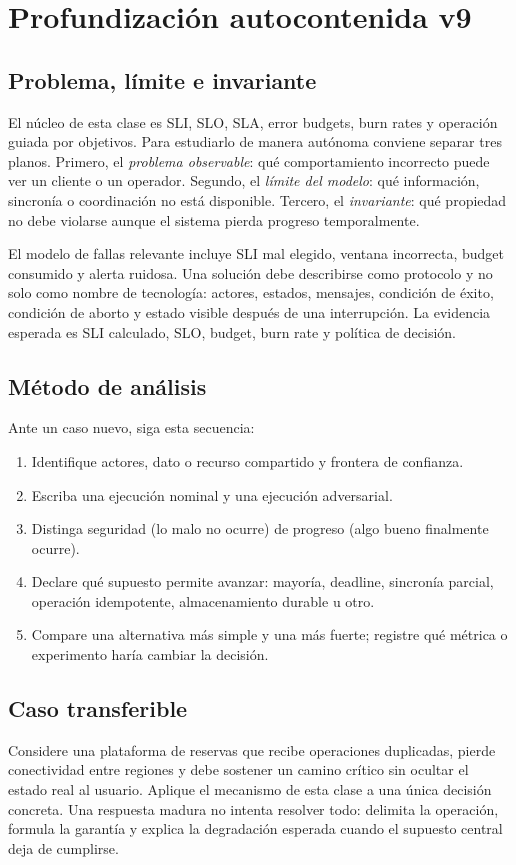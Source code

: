 \documentclass[variant=apuntes,cover=institutional,mode=screen]{ua-engineering-v6-article}
\begin{document}
\section{Profundización autocontenida v9}
\subsection{Problema, límite e invariante}
El núcleo de esta clase es SLI, SLO, SLA, error budgets, burn rates y operación guiada por objetivos. Para estudiarlo de manera autónoma conviene separar tres planos. Primero, el \emph{problema observable}: qué comportamiento incorrecto puede ver un cliente o un operador. Segundo, el \emph{límite del modelo}: qué información, sincronía o coordinación no está disponible. Tercero, el \emph{invariante}: qué propiedad no debe violarse aunque el sistema pierda progreso temporalmente.

El modelo de fallas relevante incluye SLI mal elegido, ventana incorrecta, budget consumido y alerta ruidosa. Una solución debe describirse como protocolo y no solo como nombre de tecnología: actores, estados, mensajes, condición de éxito, condición de aborto y estado visible después de una interrupción. La evidencia esperada es SLI calculado, SLO, budget, burn rate y política de decisión.

\subsection{Método de análisis}
Ante un caso nuevo, siga esta secuencia:
\begin{enumerate}
\item Identifique actores, dato o recurso compartido y frontera de confianza.
\item Escriba una ejecución nominal y una ejecución adversarial.
\item Distinga seguridad (lo malo no ocurre) de progreso (algo bueno finalmente ocurre).
\item Declare qué supuesto permite avanzar: mayoría, deadline, sincronía parcial, operación idempotente, almacenamiento durable u otro.
\item Compare una alternativa más simple y una más fuerte; registre qué métrica o experimento haría cambiar la decisión.
\end{enumerate}

\subsection{Caso transferible}
Considere una plataforma de reservas que recibe operaciones duplicadas, pierde conectividad entre regiones y debe sostener un camino crítico sin ocultar el estado real al usuario. Aplique el mecanismo de esta clase a una única decisión concreta. Una respuesta madura no intenta resolver todo: delimita la operación, formula la garantía y explica la degradación esperada cuando el supuesto central deja de cumplirse.
\end{document}
